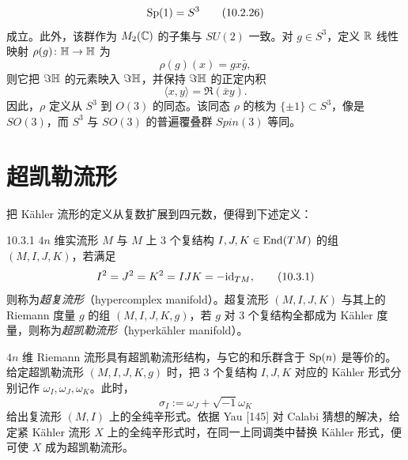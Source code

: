 \begin{equation}
  \operatorname{Sp}(1)=S^3 \tag{10.2.26}
\end{equation}
成立。此外，该群作为 $M_2(\mathbb{C})$ 的子集与 $SU(2)$ 一致。对 $g\in S^3$，定义 $\mathbb{R}$ 线性映射 $\rho(g)\colon\mathbb{H}\to\mathbb{H}$ 为
\begin{equation}
  \rho(g)(x)=gx\bar g, \tag{10.2.27}
\end{equation}
则它把 $\Im\mathbb{H}$ 的元素映入 $\Im\mathbb{H}$，并保持 $\Im\mathbb{H}$ 的正定内积
\begin{equation}
  \langle x,y\rangle=\Re(\bar xy). \tag{10.2.28}
\end{equation}
因此，$\rho$ 定义从 $S^3$ 到 $O(3)$ 的同态。该同态 $\rho$ 的核为 $\{\pm 1\}\subset S^3$，像是 $SO(3)$，而 $S^3$ 与 $SO(3)$ 的普遍覆叠群 $Spin(3)$ 等同。


\section{超凯勒流形}

把 Kähler 流形的定义从复数扩展到四元数，便得到下述定义：

\begin{definition}{10.3.1}
  $4n$ 维实流形 $M$ 与 $M$ 上 $3$ 个复结构 $I,J,K\in\operatorname{End}(TM)$ 的组 $(M,I,J,K)$，若满足
  \begin{equation}
    I^2=J^2=K^2=IJK=-\mathrm{id}_{TM}, \tag{10.3.1}
  \end{equation}
  则称为\emph{超复流形}（hypercomplex manifold）。超复流形 $(M,I,J,K)$ 与其上的 Riemann 度量 $g$ 的组 $(M,I,J,K,g)$，若 $g$ 对 $3$ 个复结构全都成为 Kähler 度量，则称为\emph{超凯勒流形}（hyperkähler manifold）。
\end{definition}

$4n$ 维 Riemann 流形具有超凯勒流形结构，与它的和乐群含于 $\operatorname{Sp}(n)$ 是等价的。给定超凯勒流形 $(M,I,J,K,g)$ 时，把 $3$ 个复结构 $I,J,K$ 对应的 Kähler 形式分别记作 $\omega_I,\omega_J,\omega_K$。此时，
\begin{equation}
  \sigma_I:=\omega_J+\sqrt{-1}\omega_K \tag{10.3.2}
\end{equation}
给出复流形 $(M,I)$ 上的全纯辛形式。依据 Yau [145] 对 Calabi 猜想的解决，给定紧 Kähler 流形 $X$ 上的全纯辛形式时，在同一上同调类中替换 Kähler 形式，便可使 $X$ 成为超凯勒流形。


